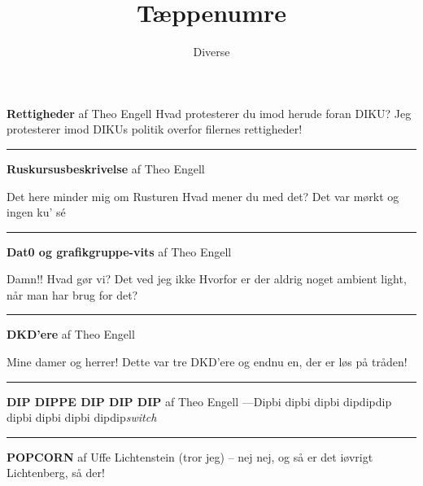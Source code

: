 \documentclass[10pt]{article}
\title{Tæppenumre}
\author{Diverse}
\begin{document}
\maketitle

\begin{sketch}

{{\flushleft\Large\bf Rettigheder} af Theo Engell} 
 Hvad protesterer du imod herude foran DIKU?
 Jeg protesterer imod DIKUs politik overfor filernes rettigheder!


\vspace{0.5cm}\hrule
{{\flushleft\Large\bf Ruskursusbeskrivelse} af Theo Engell} 

 Det here minder mig om Rusturen
 Hvad mener du med det?
 Det var mørkt og ingen ku' s\'e

\vspace{0.5cm}\hrule
{{\flushleft\Large\bf Dat0 og grafikgruppe-vits} af Theo Engell} 

 Damn!!
 Hvad gør vi?
 Det ved jeg ikke Hvorfor er der aldrig noget ambient light,
  når man har brug for det?


\vspace{0.5cm}\hrule
{{\flushleft\Large\bf DKD'ere} af Theo Engell} 



 Mine damer og herrer! Dette var tre DKD'ere og endnu en, der er
             løs på tråden!

\vspace{0.5cm}\hrule
{{\flushleft\Large\bf DIP DIPPE DIP DIP DIP} af Theo Engell} 
 ---Dipbi dipbi dipbi dipdipdip\\
dipbi dipbi dipbi dipdip{\em switch}\\

\vspace{0.5cm}\hrule
{{\flushleft\Large\bf POPCORN} af Uffe Lichtenstein (tror jeg) -- nej nej, og så er det iøvrigt Lichtenberg, så der!} 


\end{sketch}
\end{document}
